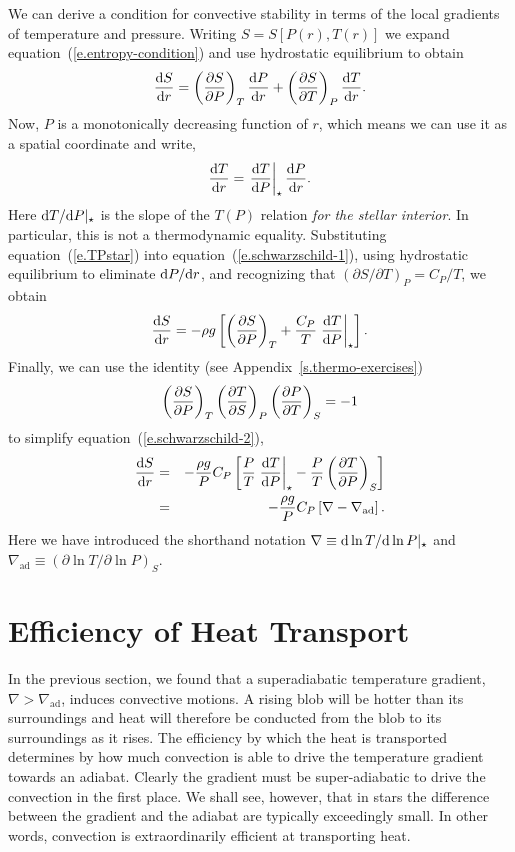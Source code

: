 We can derive a condition for convective stability in terms of the local gradients of temperature and pressure. Writing $S = S[P(r),T(r)]$ we expand equation~(\ref{e.entropy-condition}) and use hydrostatic equilibrium to obtain
\begin{equation}\label{e.schwarzschild-1}
\frac{\mathrm{d} S}{\mathrm{d} r} = \left(\frac{\partial S}{\partial P}\right)_{T} \frac{\mathrm{d} P}{\mathrm{d} r} + \left(\frac{\partial S}{\partial T}\right)_{P}\frac{\mathrm{d} T}{\mathrm{d} r} .
\end{equation}
Now, $P$ is a monotonically decreasing function of $r$, which means we can use it as a spatial coordinate and write,
\begin{equation}\label{e.TPstar}
\frac{\mathrm{d} T}{\mathrm{d} r} = \left.\frac{\mathrm{d} T}{\mathrm{d} P}\right|_{\star} \frac{\mathrm{d} P}{\mathrm{d} r} .
\end{equation}
Here $\mathrm{d} T/\mathrm{d} P|_{\star}$ is the slope of the $T(P)$ relation \emph{for the stellar interior}.  In particular, this is not a thermodynamic equality. Substituting equation~(\ref{e.TPstar}) into equation~(\ref{e.schwarzschild-1}), using hydrostatic equilibrium to eliminate $\mathrm{d} P/\mathrm{d} r$, and recognizing that $(\partial S/\partial T)_{P} = C_{P}/T$, we obtain
\begin{equation}\label{e.schwarzschild-2}
\frac{\mathrm{d} S}{\mathrm{d} r} =  -\rho g\left[\left(\frac{\partial S}{\partial P}\right)_{T} + \frac{C_{P}}{T} \left.\frac{\mathrm{d} T}{\mathrm{d} P}\right|_{\star} \right].
\end{equation}
Finally, we can use the identity (see Appendix~\ref{s.thermo-exercises})
\begin{equation}
\left(\frac{\partial S}{\partial P}\right)_{T}\left(\frac{\partial T}{\partial S}\right)_{P}\left(\frac{\partial P}{\partial T}\right)_{S} = -1
\end{equation}
to simplify equation~(\ref{e.schwarzschild-2}),
\begin{eqnarray}
\frac{\mathrm{d} S}{\mathrm{d} r} &=& -\frac{\rho g}{P}C_{P}\left[\frac{P}{T}\left.\frac{\mathrm{d} T}{\mathrm{d} P}\right|_{\star} - \frac{P}{T}\left(\frac{\partial T}{\partial P}\right)_{S}\right]\nonumber \\
 & = & -\frac{\rho g}{P}C_{P}\left[\nabla - \nabla_{\mathrm{ad}}\right].
 \label{e.schwarzschild}
\end{eqnarray}
Here we have introduced the shorthand notation $\nabla\equiv \mathrm{d} \ln T/\mathrm{d}\ln P|_{\star}$ and $\nabla_{\mathrm{ad}} \equiv \left(\partial \ln T/\partial\ln P\right)_{S}$.
 
\section{Efficiency of Heat Transport}

In the previous section, we found that a superadiabatic temperature gradient, $\nabla > \nabla_{\mathrm{ad}}$, induces convective motions. A rising blob will be hotter than its surroundings and heat will therefore be conducted from the blob to its surroundings as it rises. The efficiency by which the heat is transported determines by how much convection is able to drive the temperature gradient towards an adiabat. Clearly the gradient must be super-adiabatic to drive the convection in the first place. We shall see, however, that in stars the difference between the gradient and the adiabat are typically exceedingly small. In other words, convection is extraordinarily efficient at transporting heat.

